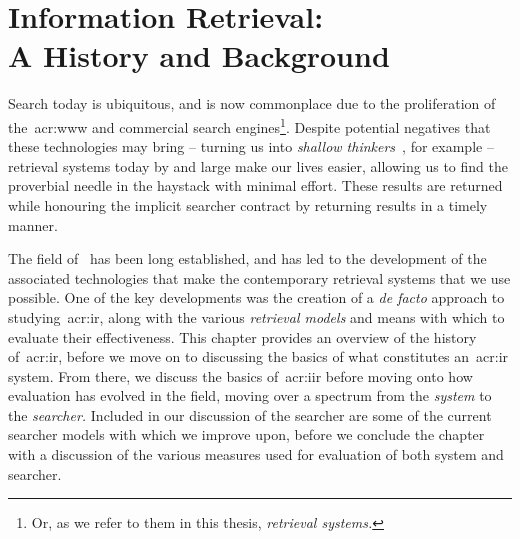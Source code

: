 
\chapter[Information Retrieval]{Information Retrieval:\\A History and Background}\label{chap:ir_background}
Search today is ubiquitous, and is now commonplace due to the proliferation of the~\gls{acr:www} and commercial search engines\footnote{Or, as we refer to them in this thesis, \emph{retrieval systems.}}. Despite potential negatives that these technologies may bring -- turning us into \emph{shallow thinkers}~\citep{carr2008google_stupid}, for example -- retrieval systems today by and large make our lives easier, allowing us to find the proverbial needle in the haystack with minimal effort. These results are returned while honouring the implicit searcher contract by returning results in a timely manner.


\begin{figure}[h]
    \centering
    \vspace{4mm}
    \label{fig:searchbox}
    \vspace{-5mm}
\end{figure}

The field of~ has been long established, and has led to the development of the associated technologies that make the contemporary retrieval systems that we use possible. One of the key developments was the creation of a \emph{de facto} approach to studying~\gls{acr:ir}, along with the various \emph{retrieval models} and means with which to evaluate their effectiveness. This chapter provides an overview of the history of~\gls{acr:ir}, before we move on to discussing the basics of what constitutes an~\gls{acr:ir} system. From there, we discuss the basics of~\gls{acr:iir} before moving onto how evaluation has evolved in the field, moving over a spectrum from the \emph{system} to the \emph{searcher.} Included in our discussion of the searcher are some of the current searcher models with which we improve upon, before we conclude the chapter with a discussion of the various measures used for evaluation of both system and searcher.

